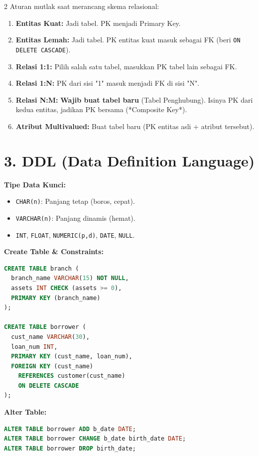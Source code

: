 \documentclass[10pt,a4paper]{article}
\begin{document}
\begin{multicols*}{2}
Aturan mutlak saat merancang skema relasional:
\begin{enumerate}
    \item \textbf{Entitas Kuat:} Jadi tabel. PK menjadi Primary Key.
    \item \textbf{Entitas Lemah:} Jadi tabel. PK entitas kuat masuk sebagai FK (beri \texttt{ON DELETE CASCADE}).
    \item \textbf{Relasi 1:1:} Pilih salah satu tabel, masukkan PK tabel lain sebagai FK.
    \item \textbf{Relasi 1:N:} PK dari sisi "1" masuk menjadi FK di sisi "N".
    \item \textbf{Relasi N:M:} \textbf{Wajib buat tabel baru} (Tabel Penghubung). Isinya PK dari kedua entitas, jadikan PK bersama (*Composite Key*).
    \item \textbf{Atribut Multivalued:} Buat tabel baru (PK entitas asli + atribut tersebut).
\end{enumerate}

\section*{3. DDL (Data Definition Language)}

\textbf{Tipe Data Kunci:}
\begin{itemize}
    \item \texttt{CHAR(n)}: Panjang tetap (boros, cepat).
    \item \texttt{VARCHAR(n)}: Panjang dinamis (hemat).
    \item \texttt{INT}, \texttt{FLOAT}, \texttt{NUMERIC(p,d)}, \texttt{DATE}, \texttt{NULL}.
\end{itemize}

\textbf{Create Table \& Constraints:}
\begin{lstlisting}[language=SQL]
CREATE TABLE branch (
  branch_name VARCHAR(15) NOT NULL,
  assets INT CHECK (assets >= 0),
  PRIMARY KEY (branch_name)
);

CREATE TABLE borrower (
  cust_name VARCHAR(30),
  loan_num INT,
  PRIMARY KEY (cust_name, loan_num),
  FOREIGN KEY (cust_name) 
    REFERENCES customer(cust_name)
    ON DELETE CASCADE
);
\end{lstlisting}

\textbf{Alter Table:}
\begin{lstlisting}[language=SQL]
ALTER TABLE borrower ADD b_date DATE;
ALTER TABLE borrower CHANGE b_date birth_date DATE;
ALTER TABLE borrower DROP birth_date;
\end{lstlisting}


\end{multicols*}
\end{document}
